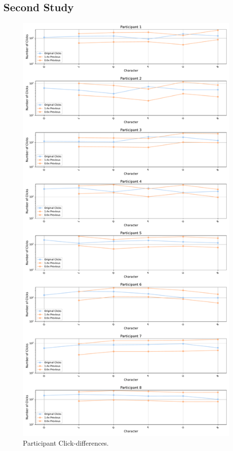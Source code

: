 \subsection{Second Study}

\begin{table}
    \caption{Second study participant data}
    \label{tab:study2_participant_data}
\end{table}
\begin{figure}
    \centering
    \includegraphics[width=0.5\linewidth]{src/pictures/Study2Data_questionnaire/participantPlots_study2.pdf}
    \caption{Participant Click-differences.}
    \label{fig:participant_clicks-secondStudy}
\end{figure}

